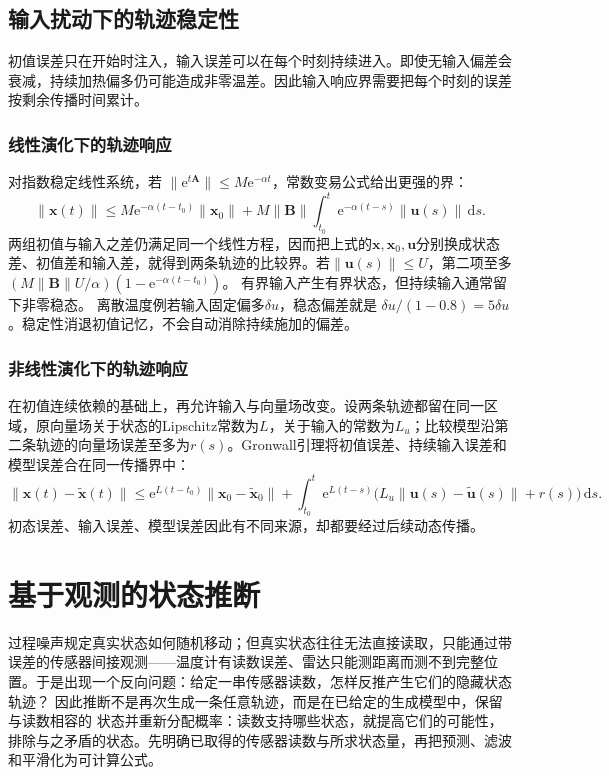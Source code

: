 \subsection{输入扰动下的轨迹稳定性}
初值误差只在开始时注入，输入误差可以在每个时刻持续进入。即使无输入偏差会衰减，持续加热偏多仍可能造成非零温差。因此输入响应界需要把每个时刻的误差按剩余传播时间累计。

\subsubsection{线性演化下的轨迹响应}
对指数稳定线性系统，若
$\|\mathrm e^{t\bm A}\|\leq M\mathrm e^{-\alpha t}$，常数变易公式给出更强的界：
\[
  \|\bm x(t)\|
  \leq M\mathrm e^{-\alpha(t-t_0)}\|\bm x_0\|
  +M\|\bm B\|\int_{t_0}^t\mathrm e^{-\alpha(t-s)}\|\bm u(s)\|\,\mathrm ds.
\]
两组初值与输入之差仍满足同一个线性方程，因而把上式的$\bm x,\bm x_0,\bm u$分别换成状态差、初值差和输入差，就得到两条轨迹的比较界。若$\|\bm u(s)\|\leq U$，第二项至多
$(M\|\bm B\|U/\alpha)(1-\mathrm e^{-\alpha(t-t_0)})$。
有界输入产生有界状态，但持续输入通常留下非零稳态。
离散温度例若输入固定偏多$\delta u$，稳态偏差就是
$\delta u/(1-0.8)=5\delta u$。稳定性消退初值记忆，不会自动消除持续施加的偏差。

\subsubsection{非线性演化下的轨迹响应}
在初值连续依赖的基础上，再允许输入与向量场改变。设两条轨迹都留在同一区域，原向量场关于状态的Lipschitz常数为$L$，关于输入的常数为$L_u$；比较模型沿第二条轨迹的向量场误差至多为$r(s)$。Gronwall引理将初值误差、持续输入误差和模型误差合在同一传播界中：
\[
  \|\bm x(t)-\widetilde{\bm x}(t)\|
  \leq \mathrm e^{L(t-t_0)}\|\bm x_0-\widetilde{\bm x}_0\|
  +\int_{t_0}^t\mathrm e^{L(t-s)}
     \bigl(L_u\|\bm u(s)-\widetilde{\bm u}(s)\|+r(s)\bigr)\,\mathrm ds.
\]
初态误差、输入误差、模型误差因此有不同来源，却都要经过后续动态传播。

\section{基于观测的状态推断}
\label{sec:dynamical-state-space-filtering}
\label{sec:dynamical-stochastic-state-observation}

过程噪声规定真实状态如何随机移动；但真实状态往往无法直接读取，只能通过带误差的传感器间接观测——温度计有读数误差、雷达只能测距离而测不到完整位置。于是出现一个反向问题：给定一串传感器读数，怎样反推产生它们的隐藏状态轨迹？
因此推断不是再次生成一条任意轨迹，而是在已给定的生成模型中，保留与读数相容的
状态并重新分配概率：读数支持哪些状态，就提高它们的可能性，排除与之矛盾的状态。先明确已取得的传感器读数与所求状态量，再把预测、滤波和平滑化为可计算公式。

